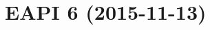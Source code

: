 \documentclass[a4paper,nofoldmark]{leaflet}
\newcommand{\code}[1]{\texttt{#1}}
\newcommand{\featureref}[1]{\textsc{#1} on page~\pageref{feat:#1}}
\begin{document}

\section{EAPI 6 (2015-11-13)}
\label{sec:cs:eapi6}
\end{document}
